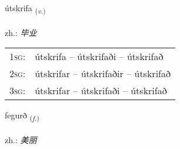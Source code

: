\documentclass[frontgrid, backgrid]{flacards}\usepackage[]{graphicx}\usepackage[]{xcolor}
\begin{document}
\renewcommand{\flhead}{\vskip5pt \fboxsep=0pt {\small\bfseries\footnotesize Sagnorð | 动词}}
\renewcommand{\fcfoot}{\vskip5pt \fboxsep=0pt \hspace{2pt}{\small\bfseries\footnotesize 3K}}

\renewcommand{\blhead}{\vskip5pt {\small\bfseries\footnotesize Sagnorð | 动词 }}
\renewcommand{\bcfoot}{\vskip5pt \hspace{2pt}{\small\bfseries\footnotesize 3K}}


{útskrifa \small{\textsubscript{(\textit{v.})}} \\[1ex] %
\textphonetic{[utskrɪva]} \\
zh.: \emph{毕业} \\  [2ex]
\renewcommand*{\arraystretch}{0.8}
\begin{tabular}{p{1cm}l}
\textsc{1sg}: & útskrifa -- útskrifaði -- útskrifað \\ 
\textsc{2sg}: & útskrifar -- útskrifaðir -- útskrifað \\ 
\textsc{3sg}: & útskrifar -- útskrifaði -- útskrifað \\ 
\end{tabular}
}

\renewcommand{\flhead}{\vskip5pt \fboxsep=0pt {\small\bfseries\footnotesize Nafnorð | 名词}}
\renewcommand{\fcfoot}{\vskip5pt \fboxsep=0pt \hspace{2pt}{\small\bfseries\footnotesize 3K}}

\renewcommand{\blhead}{\vskip5pt {\small\bfseries\footnotesize Nafnorð | 名词 }}
\renewcommand{\bcfoot}{\vskip5pt \hspace{2pt}{\small\bfseries\footnotesize 3K}}


{fegurð \small{\textsubscript{(\textit{f.})}} \\[1ex] %
\textphonetic{[fɛːɣʏrð]} \\
zh.: \emph{美丽} \\  [2ex]
\renewcommand*{\arraystretch}{0.8}
}
\end{document}
